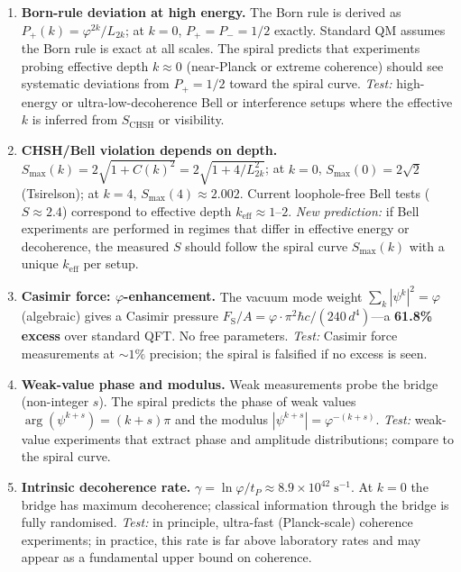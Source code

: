 \documentclass[12pt,a4paper]{article}
\begin{document}
\begin{enumerate}
\item \textbf{Born-rule deviation at high energy.} The Born rule is derived as $P_+(k) = \varphi^{2k}/L_{2k}$; at $k=0$, $P_+ = P_- = 1/2$ exactly. Standard QM assumes the Born rule is exact at all scales. The spiral predicts that experiments probing effective depth $k \approx 0$ (near-Planck or extreme coherence) should see systematic deviations from $P_+ = 1/2$ toward the spiral curve. \textit{Test:} high-energy or ultra-low-decoherence Bell or interference setups where the effective $k$ is inferred from $S_{\mathrm{CHSH}}$ or visibility.

\item \textbf{CHSH/Bell violation depends on depth.} $S_{\max}(k) = 2\sqrt{1 + C(k)^2} = 2\sqrt{1 + 4/L_{2k}^2}$; at $k=0$, $S_{\max}(0) = 2\sqrt{2}$ (Tsirelson); at $k=4$, $S_{\max}(4) \approx 2.002$. Current loophole-free Bell tests ($S \approx 2.4$) correspond to effective depth $k_{\mathrm{eff}} \approx 1$--$2$. \textit{New prediction:} if Bell experiments are performed in regimes that differ in effective energy or decoherence, the measured $S$ should follow the spiral curve $S_{\max}(k)$ with a unique $k_{\mathrm{eff}}$ per setup.

\item \textbf{Casimir force: $\varphi$-enhancement.} The vacuum mode weight $\sum_k |\psi^k|^2 = \varphi$ (algebraic) gives a Casimir pressure $F_{\mathrm{S}}/A = \varphi \cdot \pi^2\hbar c/(240\,d^4)$---a \textbf{61.8\% excess} over standard QFT. No free parameters. \textit{Test:} Casimir force measurements at $\sim 1\%$ precision; the spiral is falsified if no excess is seen.

\item \textbf{Weak-value phase and modulus.} Weak measurements probe the bridge (non-integer $s$). The spiral predicts the phase of weak values $\arg(\psi^{k+s}) = (k+s)\pi$ and the modulus $|\psi^{k+s}| = \varphi^{-(k+s)}$. \textit{Test:} weak-value experiments that extract phase and amplitude distributions; compare to the spiral curve.

\item \textbf{Intrinsic decoherence rate.} $\gamma = \ln\varphi/t_P \approx 8.9 \times 10^{42}\;\mathrm{s}^{-1}$. At $k=0$ the bridge has maximum decoherence; classical information through the bridge is fully randomised. \textit{Test:} in principle, ultra-fast (Planck-scale) coherence experiments; in practice, this rate is far above laboratory rates and may appear as a fundamental upper bound on coherence.


\end{enumerate}
\end{document}
